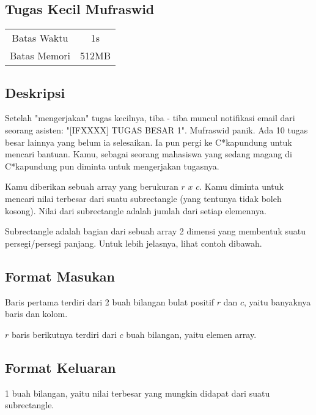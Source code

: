 \documentclass{article}
\begin{document}
\begin{center}
    \section*{Tugas Kecil Mufraswid} %

    \begin{tabular}{ | c c | }
        \hline
        Batas Waktu  & 1s \\    %
        Batas Memori & 512MB \\  %
        \hline
    \end{tabular}
\end{center}

\subsection*{Deskripsi}

Setelah "mengerjakan" tugas kecilnya, tiba - tiba muncul notifikasi email dari seorang asisten: "[IFXXXX] TUGAS BESAR 1". Mufraswid panik. Ada 10 tugas besar lainnya yang belum ia selesaikan. Ia pun pergi ke C*kapundung untuk mencari bantuan. Kamu, sebagai seorang mahasiswa yang sedang magang di C*kapundung pun diminta untuk mengerjakan tugasnya.
\par
Kamu diberikan sebuah array yang berukuran $r$ $x$ $c$. Kamu diminta untuk mencari nilai terbesar dari suatu subrectangle (yang tentunya tidak boleh kosong). Nilai dari subrectangle adalah jumlah dari setiap elemennya.
\par
Subrectangle adalah bagian dari sebuah array 2 dimensi yang membentuk suatu persegi/persegi panjang. Untuk lebih jelasnya, lihat contoh dibawah.

\subsection*{Format Masukan}

Baris pertama terdiri dari 2 buah bilangan bulat positif $r$ dan $c$, yaitu banyaknya baris dan kolom.
\par
$r$ baris berikutnya terdiri dari $c$ buah bilangan, yaitu elemen array.

\subsection*{Format Keluaran}

1 buah bilangan, yaitu nilai terbesar yang mungkin didapat dari suatu subrectangle.
\end{document}
